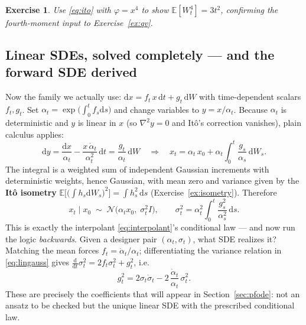 \documentclass[10pt,a4paper]{article}
\newtheorem{exercise}{Exercise}
\newcommand{\E}{\mathbb{E}}
\newcommand{\dd}{\mathrm{d}}
\begin{document}
\begin{exercise}
Use \eqref{eq:ito} with $\varphi = x^4$ to show $\E[W_t^4] = 3t^2$,
confirming the fourth-moment input to Exercise~\ref{ex:qv}.
\end{exercise}

\subsection{Linear SDEs, solved completely --- and the forward SDE derived}
\label{sec:linsde}

Now the family we actually use:
$\dd x = f_t\, x\, \dd t + g_t\, \dd W$ with time-dependent scalars
$f_t, g_t$. Set $\alpha_t = \exp\big(\int_0^t f_s \dd s\big)$ and change
variables to $y = x / \alpha_t$. Because $\alpha_t$ is deterministic and
$y$ is linear in $x$ (so $\nabla^2 y = 0$ and It\^o's correction
vanishes), plain calculus applies:
\begin{equation}
\dd y = \frac{\dd x}{\alpha_t} - \frac{x\, \dot\alpha_t}{\alpha_t^2}\,\dd t
= \frac{g_t}{\alpha_t}\, \dd W
\quad\Longrightarrow\quad
x_t = \alpha_t\, x_0 + \alpha_t \int_0^t \frac{g_s}{\alpha_s}\, \dd W_s .
\label{eq:linsol}
\end{equation}
The integral is a weighted sum of independent Gaussian increments with
deterministic weights, hence Gaussian, with mean zero and variance given
by the \textbf{It\^o isometry}
$\E\big[\big(\int h_s \dd W_s\big)^2\big] = \int h_s^2\, \dd s$
(Exercise~\ref{ex:isometry}). Therefore
\begin{equation}
x_t \mid x_0 \;\sim\; \mathcal{N}\big( \alpha_t x_0,\; \sigma_t^2 I \big),
\qquad
\sigma_t^2 = \alpha_t^2 \int_0^t \frac{g_s^2}{\alpha_s^2}\, \dd s .
\label{eq:lingauss}
\end{equation}
This is exactly the interpolant \eqref{eq:interpolant}'s conditional law
--- and now run the logic \emph{backwards}. Given a designer pair
$(\alpha_t, \sigma_t)$, what SDE realizes it? Matching the mean forces
$f_t = \dot\alpha_t / \alpha_t$; differentiating the variance relation in
\eqref{eq:lingauss} gives
$\tfrac{\dd}{\dd t}\sigma_t^2 = 2 f_t \sigma_t^2 + g_t^2$, i.e.
\begin{equation}
g_t^2 = 2\sigma_t\dot\sigma_t - 2\,\frac{\dot\alpha_t}{\alpha_t}\,\sigma_t^2 .
\end{equation}
These are precisely the coefficients that will appear in
Section~\ref{sec:pfode}: not an ansatz to be checked but the unique
linear SDE with the prescribed conditional law.
\end{document}
